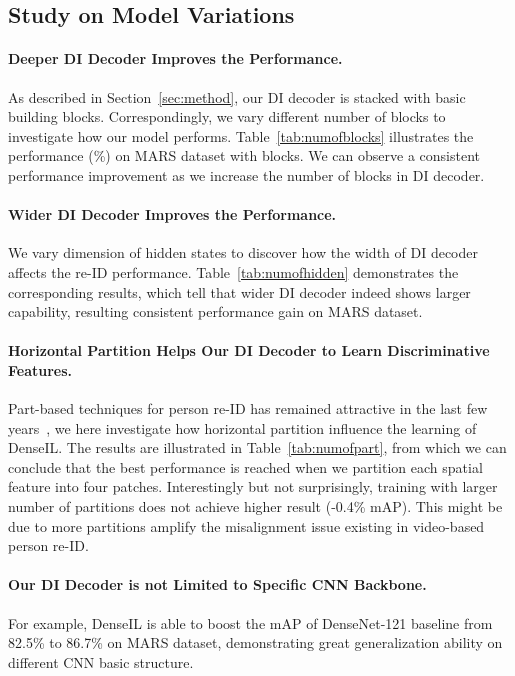 \documentclass[10pt,twocolumn,letterpaper]{article}
\begin{document}
\subsection{Study on Model Variations}
\label{exp:ablation}


\paragraph{Deeper DI Decoder Improves the Performance.}
As described in Section~\ref{sec:method}, our DI decoder is stacked with  basic building blocks. Correspondingly, we vary different number of blocks to investigate how our model performs. Table~\ref{tab:numofblocks} illustrates the performance (\%) on MARS dataset with  blocks. We can observe a consistent performance improvement as we increase the number of blocks in DI decoder.

\vspace{-2.5mm}
\paragraph{Wider DI Decoder Improves the Performance.}
We vary dimension of hidden states  to discover how the width of DI decoder affects the re-ID performance. Table~\ref{tab:numofhidden} demonstrates the corresponding results, which tell that wider DI decoder indeed shows larger capability, resulting consistent performance gain on MARS dataset.

\vspace{-2.5mm}
\paragraph{Horizontal Partition Helps Our DI Decoder to Learn Discriminative Features.}
Part-based techniques for person re-ID has remained attractive in the last few years~\cite{sun2018beyond,fu2019sta,yan2020learning,yang2020spatial,zhang2020feature}, we here investigate how horizontal partition influence the learning of DenseIL. The results are illustrated in Table~\ref{tab:numofpart}, from which we can conclude that the best performance is reached when we partition each spatial feature into four patches. Interestingly but not surprisingly, training with larger number of partitions does not achieve higher result (-0.4\% mAP). This might be due to more partitions amplify the misalignment issue existing in video-based person re-ID.

\vspace{-2mm}
\paragraph{Our DI Decoder is not Limited to Specific CNN Backbone.}
For example, DenseIL is able to boost the mAP of DenseNet-121 baseline from 82.5\% to 86.7\% on MARS dataset, demonstrating great generalization ability on different CNN basic structure.
\end{document}
